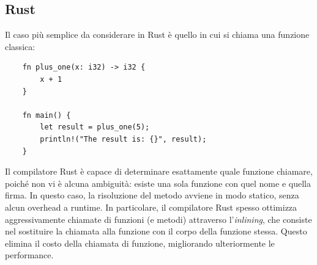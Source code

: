 \subsection{Rust}
Il caso più semplice da considerare in Rust è quello in cui si chiama una funzione classica:
\begin{verbatim}
    fn plus_one(x: i32) -> i32 {
        x + 1
    }

    fn main() {
        let result = plus_one(5);
        println!("The result is: {}", result);
    }
\end{verbatim}
Il compilatore Rust è capace di determinare esattamente quale funzione chiamare, poiché non vi è alcuna ambiguità: esiste una sola funzione con quel nome e quella firma. In questo caso, la risoluzione del metodo avviene in modo statico, senza alcun overhead a runtime. In particolare, il compilatore Rust spesso ottimizza aggressivamente chiamate di funzioni (e metodi) attraverso l'\textit{inlining}, che consiste nel sostituire la chiamata alla funzione con il corpo della funzione stessa. Questo elimina il costo della chiamata di funzione, migliorando ulteriormente le performance.

